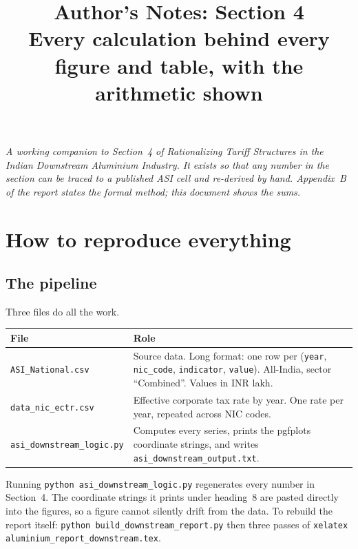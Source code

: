 \documentclass[11pt, a4paper]{article}
\title{\textbf{Author's Notes: Section 4}\\
\large Every calculation behind every figure and table, with the arithmetic shown}
\author{}
\date{}
\begin{document}
\maketitle
\vspace{-1.0cm}

\begin{center}
\small\itshape A working companion to Section~4 of \textit{Rationalizing Tariff
Structures in the Indian Downstream Aluminium Industry}. It exists so that any
number in the section can be traced to a published ASI cell and re-derived by hand.
Appendix~B of the report states the formal method; this document shows the sums.
\end{center}

\vspace{0.2cm}
\tableofcontents
\newpage

\section{How to reproduce everything}

\subsection{The pipeline}

Three files do all the work.

\begin{table}[H]
\centering
\small
\begin{tabular}{p{4.4cm}p{11.0cm}}
\toprule
\textbf{File} & \textbf{Role} \\
\midrule
\texttt{ASI\_National.csv} & Source data. Long format: one row per
(\texttt{year}, \texttt{nic\_code}, \texttt{indicator}, \texttt{value}). All-India,
sector ``Combined''. Values in INR lakh. \\
\texttt{data\_nic\_ectr.csv} & Effective corporate tax rate by year. One rate per
year, repeated across NIC codes. \\
\texttt{asi\_downstream\_logic.py} & Computes every series, prints the pgfplots
coordinate strings, and writes \texttt{asi\_downstream\_output.txt}. \\
\bottomrule
\end{tabular}
\end{table}

\noindent Running \texttt{python asi\_downstream\_logic.py} regenerates every number
in Section~4. The coordinate strings it prints under heading~8 are pasted directly
into the figures, so a figure cannot silently drift from the data. To rebuild the
report itself: \texttt{python build\_downstream\_report.py} then three passes of
\texttt{xelatex aluminium\_report\_downstream.tex}.
\end{document}
